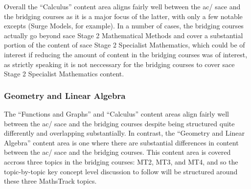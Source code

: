 \documentclass[twoside,12pt,a4paper]{report}
\begin{document}
Overall the ``Calculus'' content area aligns fairly well between the \gls{ac}/ \gls{sace} and the bridging courses as it is a major focus of the latter, with only a few notable excepts (Surge Models, for example). In a number of cases, the bridging courses actually go beyond \gls{sace} Stage 2 Mathematical Methods and cover a substantial portion of the content of \gls{sace} Stage 2 Specialist Mathematics, which could be of interest if reducing the amount of content in the bridging courses was of interest, as strictly speaking it is not neccessary for the bridging courses to cover \gls{sace} Stage 2 Specialist Mathematics content.

\subsubsection{Geometry and Linear Algebra}

The ``Functions and Graphs'' and ``Calculus'' content areas align fairly well between the \gls{ac}/ \gls{sace} and the bridging courses despite being structured quite differently and overlapping substantially. In contrast, the ``Geometry and Linear Algebra'' content area is one where there are substantial differences in content between the \gls{ac}/ \gls{sace} and the bridging courses. This content area is covered accross three topics in the bridging courses: MT2, MT3, and MT4, and so the topic-by-topic key concept level discussion to follow will be structured around these three MathsTrack topics.
\end{document}
